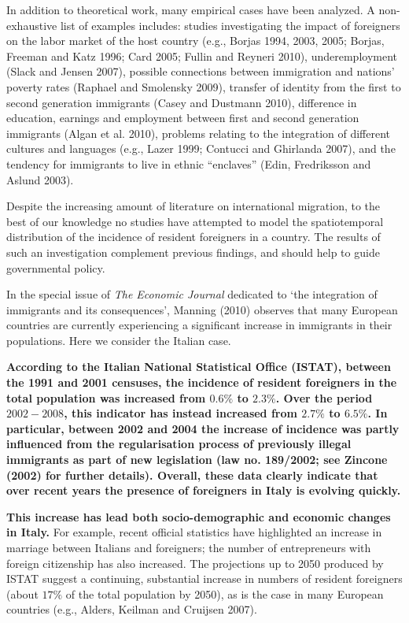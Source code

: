 \documentclass[10pt] {article}
\theoremstyle{definition}
\theoremstyle{plain}
\begin{document}
In addition to theoretical work, many empirical cases have been analyzed. A non-exhaustive list of examples includes: studies investigating the impact of foreigners on the labor market of the host country (e.g., Borjas 1994, 2003, 2005; Borjas, Freeman and Katz 1996; Card 2005; Fullin and Reyneri 2010), underemployment (Slack and Jensen 2007), possible connections between immigration and nations' poverty rates (Raphael and Smolensky 2009), transfer of identity from the first to second generation immigrants (Casey and Dustmann 2010), difference in education, earnings and employment between first and second generation immigrants (Algan et al. 2010), problems relating to the integration of different cultures and languages (e.g., Lazer 1999; Contucci and Ghirlanda 2007), and the tendency for immigrants to live in ethnic ``enclaves'' (Edin, Fredriksson and Aslund 2003). 

Despite the increasing amount of  literature on international migration, to the best of our knowledge no studies have attempted to model the spatiotemporal distribution of the incidence of resident foreigners in a country. The results of such an investigation complement previous findings, and should help to guide governmental policy. 

In the special issue of \textit{The Economic Journal} dedicated to `the integration of immigrants and its consequences', Manning (2010) observes that many European countries are currently experiencing a significant increase in immigrants in their populations. Here we consider the Italian case. 


\textbf{According to the Italian National Statistical Office (ISTAT), between the 1991 and 2001 censuses, the incidence of resident foreigners in the total population was increased from $0.6\%$ to $2.3\%$. Over the period $2002-2008$, this indicator has instead increased from $2.7\%$ to $6.5\%$. In particular, between 2002 and 2004 the increase of incidence was partly influenced from the regularisation process of previously illegal immigrants as part of new legislation (law no. 189/2002; see Zincone (2002) for further details). Overall, these data clearly indicate that over recent years the presence of foreigners in Italy is evolving quickly.} 

\textbf{This increase has lead both socio-demographic and economic changes in Italy.} For example, recent official statistics have highlighted an increase in marriage between Italians and foreigners; the number of entrepreneurs with foreign citizenship has also increased. The projections up to 2050 produced by ISTAT suggest a continuing, substantial increase in numbers of resident foreigners (about $17\%$ of the total population by 2050), as is the case in many European countries (e.g., Alders, Keilman and Cruijsen 2007). 
\end{document}
